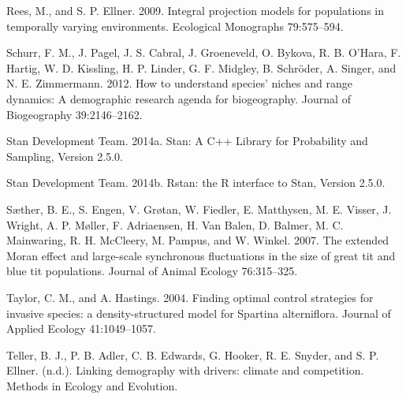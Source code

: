 \documentclass[12pt,]{article}
\begin{document}
Rees, M., and S. P. Ellner. 2009. Integral projection models for
populations in temporally varying environments. Ecological Monographs
79:575--594.

Schurr, F. M., J. Pagel, J. S. Cabral, J. Groeneveld, O. Bykova, R. B.
O'Hara, F. Hartig, W. D. Kissling, H. P. Linder, G. F. Midgley, B.
Schr{ö}der, A. Singer, and N. E. Zimmermann. 2012. How to understand
species' niches and range dynamics: A demographic research agenda for
biogeography. Journal of Biogeography 39:2146--2162.

Stan Development Team. 2014a. Stan: A C++ Library for Probability and
Sampling, Version 2.5.0.

Stan Development Team. 2014b. Rstan: the R interface to Stan, Version
2.5.0.

S{æ}ther, B. E., S. Engen, V. Gr{ø}tan, W. Fiedler, E. Matthysen, M. E.
Visser, J. Wright, A. P. M{ø}ller, F. Adriaensen, H. {Van Balen}, D.
Balmer, M. C. Mainwaring, R. H. McCleery, M. Pampus, and W. Winkel.
2007. The extended Moran effect and large-scale synchronous fluctuations
in the size of great tit and blue tit populations. Journal of Animal
Ecology 76:315--325.

Taylor, C. M., and A. Hastings. 2004. Finding optimal control strategies
for invasive species: a density-structured model for Spartina
alterniflora. Journal of Applied Ecology 41:1049--1057.

Teller, B. J., P. B. Adler, C. B. Edwards, G. Hooker, R. E. Snyder, and
S. P. Ellner. (n.d.). Linking demography with drivers: climate and
competition. Methods in Ecology and Evolution.
\end{document}
